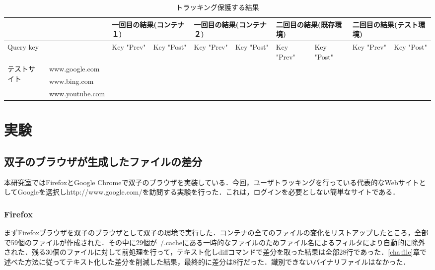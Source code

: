\documentclass[submit]{ipsj}
\begin{document}
\begin{table}[ht]
\caption{トラッキング保護する結果}
\centering

\begin{tabular}{ |p{1cm}|p{2cm}|p{1cm}|p{1cm}|p{1cm}|p{1cm}|p{1cm}|p{1cm}|p{1cm}|p{1cm}| }

 \hline
 \multicolumn{2}{|p{3cm}}{}　&\multicolumn{2}{|p{2cm}}{一回目の結果(コンテナ１)}　&\multicolumn{2}{|p{2cm}}{一回目の結果(コンテナ２)}&\multicolumn{2}{|p{2cm}}{二回目の結果(既存環境)}　&\multicolumn{2}{|p{2cm}|}{二回目の結果(テスト環境)}\\
 \hline
 \multicolumn{2}{|p{3cm}|}{Query key}  & Key "Prev" & Key "Post" &  Key "Prev" & Key "Post" & Key "Prev" & Key "Post" &  Key "Prev" & Key "Post" \\
 \hline
 \multirow{3}{*}{テストサイト}　& www.google.com &  &  &  & &  &  &  &  \\
 & www.bing.com &  &  &  & &  &  &  &    \\ 
 & www.youtube.com &  &  &  & &  &  &  &    \\
 \hline

\end{tabular}
\label{fig:pro}
\end{table}





\section{実験}
\subsection{双子のブラウザが生成したファイルの差分}
\label{sec:file}

本研究室ではFirefoxとGoogle Chromeで双子のブラウザを実装している．今回，ユーザトラッキングを行っている代表的なWebサイトとしてGoogleを選択しhttp://www.google.com/を訪問する実験を行った．これは，ログインを必要としない簡単なサイトである．

\subsubsection{Firefox}
まずFirefoxブラウザを双子のブラウザとして双子の環境で実行した．コンテナの全てのファイルの変化をリストアップしたところ，全部で59個のファイルが作成された．その中に29個が~/.cacheにある一時的なファイルのためファイル名によるフィルタにより自動的に除外された．残る30個のファイルに対して前処理を行って，テキスト化しdiffコマンドで差分を取った結果は全部28行であった．\ref{cha:file}章で述べた方法に従ってテキスト化した差分を削減した結果，最終的に差分は8行だった．識別できないバイナリファイルはなかった．
\end{document}
